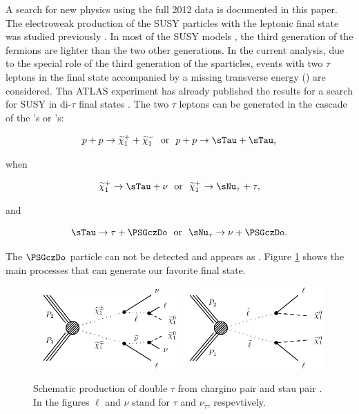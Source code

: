 A search for new physics using the full 2012 data is documented in this paper. 
The electroweak production of the SUSY particles with the leptonic final state was studied previously \cite{Khachatryan:2014qwa}.
In most of the SUSY models \cite{Martin:1997ns}, the third generation of the fermions are lighter than the two other generations. 
In the current analysis, due to the special role of the third generation of the sparticles, events with two $\tau$ leptons in the final state 
accompanied by a missing transverse energy (\MET) are considered. 
Tha ATLAS experiment has already published the results for a search for SUSY in di-$\tau$ final states \cite{Aad:2014yka}.
The two $\tau$ leptons can be generated in the cascade of the \sTau's or \PSGcpDo's:
\begin{linenomath}
\begin{equation}
p + p \rightarrow \PSGcpDo +\PSGcmDo ~~\mathrm{or}~~  p + p \rightarrow \sTau + \sTau,
\end{equation}
\end{linenomath}
when 
\begin{linenomath}
\begin{equation}
\PSGcpDo \rightarrow \sTau + \nu ~~\mathrm{or}~~  \PSGcpDo \rightarrow \sNu_{\tau} + \tau,
\end{equation}
\end{linenomath}
and 
\begin{linenomath}
\begin{equation}
\sTau \rightarrow \tau + \PSGczDo ~~\mathrm{or}~~  \sNu_{\tau} \rightarrow \nu + \PSGczDo.
\end{equation}
\end{linenomath}
The $\PSGczDo$ particle can not be detected and appears as \MET.
Figure \ref{fig:Productions} shows the main processes that can generate our favorite final state.
\begin{figure}[!Hhtb]
\centering
\includegraphics[width=0.49\textwidth]{Introductionfigs/TChipmSlepSnu.pdf}
\includegraphics[width=0.49\textwidth]{Introductionfigs/TSlepSlep.pdf}
\caption{Schematic production of double $\tau$ from chargino pair and stau pair \cite{Khachatryan:2014qwa}. 
  In the figures $\ell$ and $\nu$ stand for $\tau$ and $\nu_{\tau}$, respevtively.}
\label{fig:Productions}
\end{figure}
